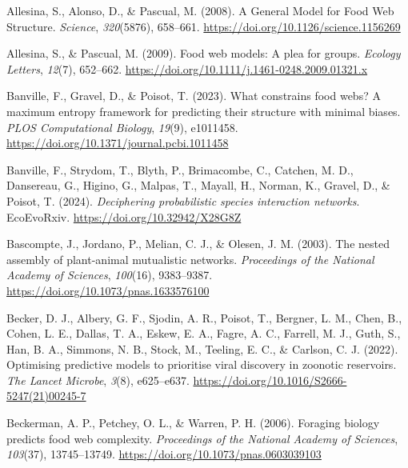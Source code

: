 \documentclass[
]{article}
\newlength{\cslhangindent}
\newenvironment{CSLReferences}[2] %
 {\begin{list}{}{%
  \setlength{\itemindent}{0pt}
  \setlength{\leftmargin}{0pt}
  \setlength{\parsep}{0pt}
  \ifodd #1
   \setlength{\leftmargin}{\cslhangindent}
   \setlength{\itemindent}{-1\cslhangindent}
  \fi
  \setlength{\itemsep}{#2\baselineskip}}}
 {\end{list}}
\begin{document}
\label{refs}
\begin{CSLReferences}{1}{0}
Allesina, S., Alonso, D., \& Pascual, M. (2008). A {General Model} for
{Food Web Structure}. \emph{Science}, \emph{320}(5876), 658--661.
\url{https://doi.org/10.1126/science.1156269}

Allesina, S., \& Pascual, M. (2009). Food web models: A plea for groups.
\emph{Ecology Letters}, \emph{12}(7), 652--662.
\url{https://doi.org/10.1111/j.1461-0248.2009.01321.x}

Banville, F., Gravel, D., \& Poisot, T. (2023). What constrains food
webs? {A} maximum entropy framework for predicting their structure with
minimal biases. \emph{PLOS Computational Biology}, \emph{19}(9),
e1011458. \url{https://doi.org/10.1371/journal.pcbi.1011458}

Banville, F., Strydom, T., Blyth, P., Brimacombe, C., Catchen, M. D.,
Dansereau, G., Higino, G., Malpas, T., Mayall, H., Norman, K., Gravel,
D., \& Poisot, T. (2024). \emph{Deciphering probabilistic species
interaction networks}. EcoEvoRxiv. \url{https://doi.org/10.32942/X28G8Z}

Bascompte, J., Jordano, P., Melian, C. J., \& Olesen, J. M. (2003). The
nested assembly of plant-animal mutualistic networks. \emph{Proceedings
of the National Academy of Sciences}, \emph{100}(16), 9383--9387.
\url{https://doi.org/10.1073/pnas.1633576100}

Becker, D. J., Albery, G. F., Sjodin, A. R., Poisot, T., Bergner, L. M.,
Chen, B., Cohen, L. E., Dallas, T. A., Eskew, E. A., Fagre, A. C.,
Farrell, M. J., Guth, S., Han, B. A., Simmons, N. B., Stock, M.,
Teeling, E. C., \& Carlson, C. J. (2022). Optimising predictive models
to prioritise viral discovery in zoonotic reservoirs. \emph{The Lancet
Microbe}, \emph{3}(8), e625--e637.
\url{https://doi.org/10.1016/S2666-5247(21)00245-7}

Beckerman, A. P., Petchey, O. L., \& Warren, P. H. (2006). Foraging
biology predicts food web complexity. \emph{Proceedings of the National
Academy of Sciences}, \emph{103}(37), 13745--13749.
\url{https://doi.org/10.1073/pnas.0603039103}


\end{CSLReferences}
\end{document}
